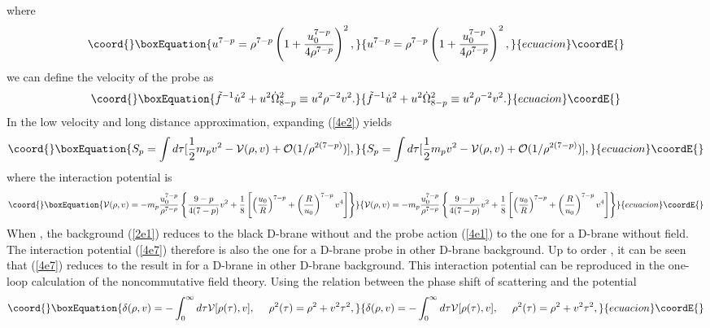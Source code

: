 \documentclass[a4paper,12pt]{article}
\begin{document}
where
\begin{equation}\coord{}\boxEquation{
u^{7-p}=\rho^{7-p}\left ( 1+\frac{u_0^{7-p}}{4\rho^{7-p}} \right)^2,
}{
u^{7-p}=\rho^{7-p}\left ( 1+\frac{u_0^{7-p}}{4\rho^{7-p}} \right)^2,
}{ecuacion}\coordE{}\end{equation}
we can define the velocity of the probe as
\begin{equation}\coord{}\boxEquation{
\tilde{f}^{-1}\dot{u}^2 + u^2 \dot{\Omega}_{8-p}^2
 \equiv u^2{\rho}^{-2}v^2.
}{
\tilde{f}^{-1}\dot{u}^2 + u^2 \dot{\Omega}_{8-p}^2
 \equiv u^2{\rho}^{-2}v^2.
}{ecuacion}\coordE{}\end{equation}
In the low velocity and long distance approximation, expanding (\ref{4e2})
yields
\begin{equation}\coord{}\boxEquation{
S_p =\int d\tau [\frac{1}{2}m_p v^2 -{\cal V}(\rho,v)
 +{\cal O}(1/\rho^{2(7-p)})],
}{
S_p =\int d\tau [\frac{1}{2}m_p v^2 -{\cal V}(\rho,v)
 +{\cal O}(1/\rho^{2(7-p)})],
}{ecuacion}\coordE{}\end{equation}
where the interaction potential \coordHE{} is
\begin{equation}\coord{}\boxEquation{
\label{4e7}
{\cal V}(\rho, v)=-m_p\frac{u_0^{7-p}}{\rho^{7-p}}
  \left \{ \frac{9-p}{4(7-p)} v^2
 +\frac{1}{8}\left [\left(\frac{u_0}{R}\right)^{7-p} +
  \left(\frac{R}{u_0}\right)^{7-p}v^4 \right] \right\}
}{
{\cal V}(\rho, v)=-m_p\frac{u_0^{7-p}}{\rho^{7-p}}
  \left \{ \frac{9-p}{4(7-p)} v^2
 +\frac{1}{8}\left [\left(\frac{u_0}{R}\right)^{7-p} +
  \left(\frac{R}{u_0}\right)^{7-p}v^4 \right] \right\}
}{ecuacion}\coordE{}\end{equation}
When \coordHE{}, the background (\ref{2e1}) reduces to the black D\coordHE{}-brane
without \coordHE{} and the probe action (\ref{4e1}) to the one for a D\coordHE{}-brane
without \coordHE{} field. The interaction potential (\ref{4e7}) therefore is also
the one for a D\coordHE{}-brane probe in other D\coordHE{}-brane background. Up to order
\coordHE{}, it can be seen that (\ref{4e7}) reduces to the result in \cite{Mald3}
for a D\coordHE{}-brane in other D\coordHE{}-brane background. This interaction potential
can be reproduced in the one-loop calculation of the noncommutative field
theory. Using the relation between the phase shift of scattering and the
potential~\cite{Chep1}
\begin{equation}\coord{}\boxEquation{
\delta (\rho,v) =-\int^{\infty}_0 d\tau {\cal V}[\rho(\tau),v],
\ \ \ \ \rho^2(\tau) =\rho^2 +v^2 \tau^2,
}{
\delta (\rho,v) =-\int^{\infty}_0 d\tau {\cal V}[\rho(\tau),v],
\ \ \ \ \rho^2(\tau) =\rho^2 +v^2 \tau^2,
}{ecuacion}\coordE{}\end{equation}
\end{document}

